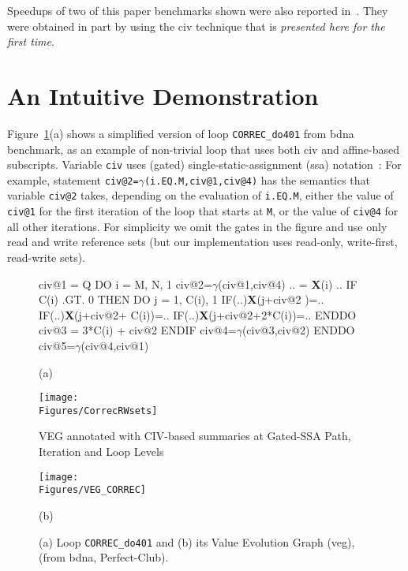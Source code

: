 \documentclass[10pt,nocopyrightspace]{sigplanconf}
\newcommand{\mymath}[1]{$ #1 $}
\newcommand{\Figures}[1]{../Figures/}
\begin{document}
Speedups of two of this paper benchmarks shown were also reported 
in~\cite{CosPLDI}. They were obtained in part by using the {\sc civ} 
technique that is {\em presented here for the first time}.


\section{An Intuitive Demonstration}
\label{Intro:RelAppLim}

Figure~\ref{fig:codeActforCorrec}(a) shows a simplified version of
loop {\tt CORREC\_do401} from {\sc bdna} benchmark, 
as an example of non-trivial loop that uses both {\sc civ} and affine-based
subscripts.   Variable {\tt civ}  uses (gated) 
single-static-assignment ({\sc ssa}) notation~\cite{GatedSSA}: 
%
For example, statement {\tt civ@2=$\gamma$(i.EQ.M,civ@1,civ@4)}
has the semantics that variable {\tt civ@2} takes, depending 
on the evaluation of {\tt i.EQ.M}, either the value of {\tt civ@1} for 
the first iteration of the loop that starts at {\tt M}, or the value of 
{\tt civ@4} for all other iterations. For simplicity we omit the gates 
in the figure and use only read and write reference sets
(but our implementation uses read-only, write-first, read-write sets).

\begin{figure}
\begin{minipage}{0.49\columnwidth}
\begin{colorcode}
civ@1 = Q
DO i = M, N, 1
 civ@2=\mymath{\gamma}(civ@1,civ@4)
 .. = {\bf X}(i) ..
 IF C(i) .GT. 0 THEN
  DO j = 1, C(i), 1
   IF(..){\bf{}X}(j+civ@2       )=..
   IF(..){\bf{}X}(j+civ@2+  C(i))=..
   IF(..){\bf{}X}(j+civ@2+2*C(i))=..
  ENDDO
  civ@3 = 3*C(i) + civ@2
 ENDIF
 civ@4=\mymath{\gamma}(civ@3,civ@2)
ENDDO
civ@5=\mymath{\gamma}(civ@4,civ@1)
  
            (a)
\end{colorcode}
\hspace{2ex}\texttt{[image: \\Figures/CorrecRWsets]}
\end{minipage}
\begin{minipage}{0.45\columnwidth}
\begin{colorcode}
      VEG annotated with 
      CIV-based summaries 
      at Gated-SSA Path, 
         Iteration and 
         Loop Levels
\end{colorcode}
\texttt{[image: \\Figures/VEG\_CORREC]}
\begin{colorcode}
                (b)
\end{colorcode}
\end{minipage}
\caption{(a) Loop {\tt CORREC\_do401} and (b) its Value Evolution Graph ({\sc veg}),
                (from {\sc bdna}, {\sc Perfect-Club}).}
\label{fig:codeActforCorrec}
\end{figure}
\end{document}
